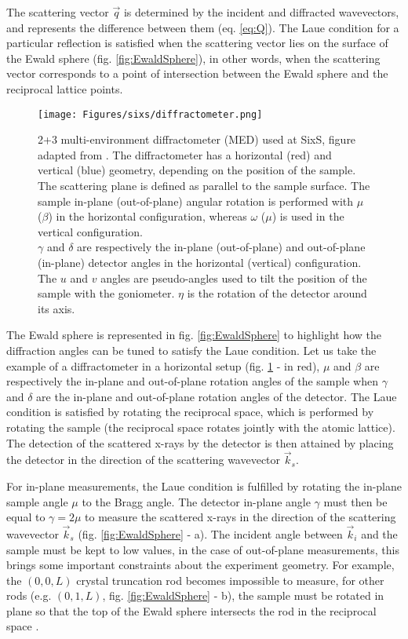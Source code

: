 The scattering vector $\vec{q}$ is determined by the incident and diffracted wavevectors, and represents the difference between them (eq. \ref{eq:Q}).
The Laue condition for a particular reflection is satisfied when the scattering vector lies on the surface of the Ewald sphere (fig. \ref{fig:EwaldSphere}), in other words, when the scattering vector corresponds to a point of intersection between the Ewald sphere and the reciprocal lattice points.

\begin{figure}[!htb]
    \centering
    \texttt{[image: Figures/sixs/diffractometer.png]}
    \caption{
    2+3 multi-environment diffractometer (MED) used at SixS, figure adapted from \cite{Schleputz2011}.
    The diffractometer has a horizontal (red) and vertical (blue) geometry, depending on the position of the sample.\\
    The scattering plane is defined as parallel to the sample surface.
    The sample in-plane (out-of-plane) angular rotation is performed with $\mu$ ($\beta$) in the horizontal configuration, whereas $\omega$ ($\mu$) is used in the vertical configuration.\\
    $\gamma$ and $\delta$ are respectively the in-plane (out-of-plane) and out-of-plane (in-plane) detector angles in the horizontal (vertical) configuration.\\
    The $u$ and $v$ angles are pseudo-angles used to tilt the position of the sample with the goniometer.
    $\eta$ is the rotation of the detector around its axis.
    }
    \label{fig:Diffractometer}
\end{figure}

The Ewald sphere is represented in fig. \ref{fig:EwaldSphere} to highlight how the diffraction angles can be tuned to satisfy the Laue condition.
Let us take the example of a diffractometer in a horizontal setup (fig. \ref{fig:Diffractometer} - in red), $\mu$ and $\beta$ are respectively the in-plane and out-of-plane rotation angles of the sample when $\gamma$ and $\delta$ are the in-plane and out-of-plane rotation angles of the detector.
The Laue condition is satisfied by rotating the reciprocal space, which is performed by rotating the sample (the reciprocal space rotates jointly with the atomic lattice).
The detection of the scattered x-rays by the detector is then attained by placing the detector in the direction of the scattering wavevector $\vec{k}_s$.

For in-plane measurements, the Laue condition is fulfilled by rotating the in-plane sample angle $\mu$ to the Bragg angle.
The detector in-plane angle $\gamma$ must then be equal to $\gamma = 2 \mu$ to measure the scattered x-rays in the direction of the scattering wavevector $\vec{k}_s$ (fig. \ref{fig:EwaldSphere} - a).
The incident angle between $\vec{k}_i$ and the sample must be kept to low values, in the case of out-of-plane measurements, this brings some important constraints about the experiment geometry.
For example, the $(0, 0, L)$ crystal truncation rod becomes impossible to measure, for other rods (e.g. $(0, 1, L)$, fig. \ref{fig:EwaldSphere} - b), the sample must be rotated in plane so that the top of the Ewald sphere intersects the rod in the reciprocal space \parencite{Vlieg1997, Schleputz2005}.

